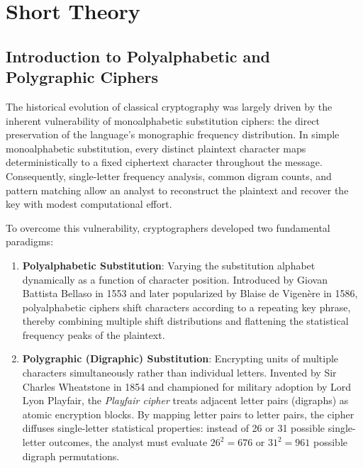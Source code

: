 \documentclass{labreport}
\begin{document}

\tableofcontents
\newpage

\section{Short Theory}

\subsection{Introduction to Polyalphabetic and Polygraphic Ciphers}
The historical evolution of classical cryptography was largely driven by the inherent vulnerability of monoalphabetic substitution ciphers: the direct preservation of the language's monographic frequency distribution. In simple monoalphabetic substitution, every distinct plaintext character maps deterministically to a fixed ciphertext character throughout the message. Consequently, single-letter frequency analysis, common digram counts, and pattern matching allow an analyst to reconstruct the plaintext and recover the key with modest computational effort.

To overcome this vulnerability, cryptographers developed two fundamental paradigms:
\begin{enumerate}
    \item \textbf{Polyalphabetic Substitution}: Varying the substitution alphabet dynamically as a function of character position. Introduced by Giovan Battista Bellaso in 1553 and later popularized by Blaise de Vigen\`{e}re in 1586, polyalphabetic ciphers shift characters according to a repeating key phrase, thereby combining multiple shift distributions and flattening the statistical frequency peaks of the plaintext.
    \item \textbf{Polygraphic (Digraphic) Substitution}: Encrypting units of multiple characters simultaneously rather than individual letters. Invented by Sir Charles Wheatstone in 1854 and championed for military adoption by Lord Lyon Playfair, the \textit{Playfair cipher} treats adjacent letter pairs (digraphs) as atomic encryption blocks. By mapping letter pairs to letter pairs, the cipher diffuses single-letter statistical properties: instead of 26 or 31 possible single-letter outcomes, the analyst must evaluate $26^2 = 676$ or $31^2 = 961$ possible digraph permutations.
\end{enumerate}
\end{document}
